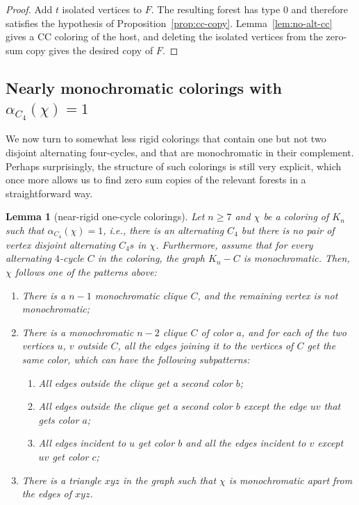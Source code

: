 \documentclass[11pt]{article}
\newtheorem{lemma}[theorem]{Lemma}
\begin{document}
\begin{proof}
Add $t$ isolated vertices to $F$.  The resulting forest has type $0$ and therefore satisfies the hypothesis of Proposition~\ref{prop:cc-copy}.  Lemma~\ref{lem:no-alt-cc} gives a CC coloring of the host, and deleting the isolated vertices from the zero-sum copy gives the desired copy of $F$.
\end{proof}



\subsection{Nearly monochromatic colorings with $\alpha_{C_4}(\chi)=1$}

We now turn to somewhat less rigid colorings that contain one but not two disjoint alternating four-cycles, and that are monochromatic in their complement. Perhaps surprisingly, the structure of such colorings is still very explicit, which once more allows us to find zero sum copies of the relevant forests in a straightforward way.

\begin{lemma}[near-rigid one-cycle colorings]\label{lem:one-cycle-structure}
   Let $n \geq 7$ and $\chi$ be a coloring of $K_n$ such that $\alpha_{C_4}(\chi)=1$, i.e., there is an alternating $C_4$ but there is no pair of vertex disjoint alternating $C_4s$ in $\chi$. Furthermore, assume that for every alternating $4$-cycle $C$ in the coloring, the graph $K_n-C$ is monochromatic. Then, $\chi$ follows one of the patterns above:

   \begin{enumerate}
       \item There is a $n-1$ monochromatic clique $C$, and the remaining vertex is not monochromatic;

       \item There is a monochromatic $n-2$ clique $C$ of color $a$, and for each of the two vertices $u$, $v$ outside $C$, all the edges joining it to the vertices of $C$ get the same color, which can have the following subpatterns:

       \begin{enumerate}
           \item All edges outside the clique get a second color $b$;

           \item All edges outside the clique get a second color $b$ except the edge $uv$ that gets color $a$;

           \item All edges incident to $u$ get color $b$ and all the edges incident to $v$ except $uv$ get color $c$;
       \end{enumerate}

       \item There is a triangle $xyz$ in the graph such that $\chi$ is monochromatic apart from the edges of $xyz$.
   \end{enumerate}

\end{lemma}
\end{document}
